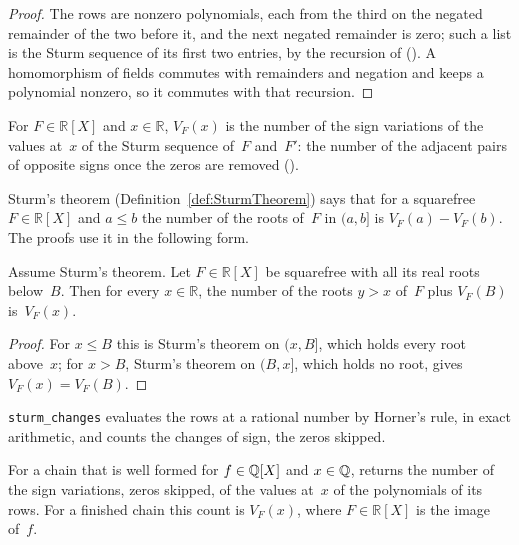 \begin{proof}
  \leanok
  The rows are nonzero polynomials, each from the third on the negated remainder of the two before
  it, and the next negated remainder is zero; such a list is the Sturm sequence of its first two
  entries, by the recursion of 
  (). A homomorphism of fields commutes with remainders
  and negation and keeps a polynomial nonzero, so it commutes with that recursion.
\end{proof}

\begin{definition}\label{def:sturmV}
  \leanok
  For $F \in \mathbb{R}[X]$ and $x \in \mathbb{R}$, $V_F(x)$ is the number of the sign variations
  of the values at~$x$ of the Sturm sequence of~$F$ and~$F'$: the number of the adjacent pairs of
  opposite signs once the zeros are removed ().
\end{definition}

Sturm's theorem (Definition~\ref{def:SturmTheorem}) says that for a squarefree $F \in \mathbb{R}[X]$
and $a \le b$ the number of the roots of~$F$ in $(a, b]$ is $V_F(a) - V_F(b)$. The proofs use it in
the following form.

\begin{lemma}\label{lem:ncard_add_sturmV}
  \leanok
  Assume Sturm's theorem. Let $F \in \mathbb{R}[X]$ be squarefree with all its real roots below~$B$.
  Then for every $x \in \mathbb{R}$, the number of the roots $y > x$ of~$F$ plus $V_F(B)$
  is~$V_F(x)$.
\end{lemma}

\begin{proof}
  \leanok
  For $x \le B$ this is Sturm's theorem on $(x, B]$, which holds every root above~$x$; for $x > B$,
  Sturm's theorem on $(B, x]$, which holds no root, gives $V_F(x) = V_F(B)$.
\end{proof}

\texttt{sturm\_changes} evaluates the rows at a rational number by Horner's rule, in exact
arithmetic, and counts the changes of sign, the zeros skipped.

\begin{lemma}\label{lem:SturmChain.IsFinished.run_sturmChanges}
  \leanok
  For a chain that is well formed for $f \in \mathbb{Q}[X]$ and $x \in \mathbb{Q}$, 
  returns the number of the sign variations, zeros skipped, of the values at~$x$ of the polynomials
  of its rows. For a finished chain this count is $V_F(x)$, where $F \in \mathbb{R}[X]$ is the image
  of~$f$.
\end{lemma}

